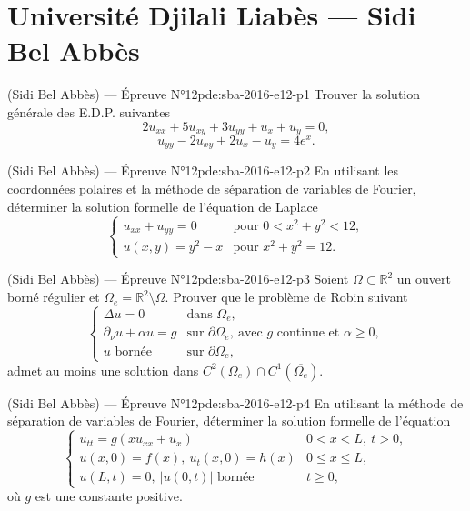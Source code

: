 \section{Université Djilali Liabès --- Sidi Bel Abbès}
\begin{problem}{(Sidi Bel Abbès) — Épreuve N°12}{pde:sba-2016-e12-p1}
Trouver la solution générale des E.D.P. suivantes
$$2u_{xx}+5u_{xy}+3u_{yy}+u_x+u_y=0,$$
$$u_{yy}-2u_{xy}+2u_x-u_y=4e^x.$$
\end{problem}
\newpage
\begin{problem}{(Sidi Bel Abbès) — Épreuve N°12}{pde:sba-2016-e12-p2}
En utilisant les coordonnées polaires et la méthode de séparation de variables de Fourier, déterminer la solution formelle de l'équation de Laplace
$$\begin{cases}u_{xx}+u_{yy}=0 & \text{pour } 0<x^2+y^2<12,\\ u(x,y)=y^2-x & \text{pour } x^2+y^2=12.\end{cases}$$
\end{problem}
\newpage
\begin{problem}{(Sidi Bel Abbès) — Épreuve N°12}{pde:sba-2016-e12-p3}
Soient $\Omega\subset\mathbb{R}^2$ un ouvert borné régulier et $\Omega_e=\mathbb{R}^2\setminus\Omega$. Prouver que le problème de Robin suivant
$$\begin{cases}\Delta u=0 & \text{dans } \Omega_e,\\ \partial_{\nu}u+\alpha u=g & \text{sur } \partial\Omega_e,\ \text{avec } g \text{ continue et } \alpha\ge0,\\ u \text{ bornée} & \text{sur } \partial\Omega_e,\end{cases}$$
admet au moins une solution dans $C^2(\Omega_e)\cap C^1(\overline{\Omega_e})$.
\end{problem}
\newpage
\begin{problem}{(Sidi Bel Abbès) — Épreuve N°12}{pde:sba-2016-e12-p4}
En utilisant la méthode de séparation de variables de Fourier, déterminer la solution formelle de l'équation
$$\begin{cases}u_{tt}=g\left(xu_{xx}+u_x\right) & 0<x<L,\ t>0,\\ u(x,0)=f(x),\ u_t(x,0)=h(x) & 0\le x\le L,\\ u(L,t)=0,\ |u(0,t)| \text{ bornée} & t\ge0,\end{cases}$$
où $g$ est une constante positive.
\end{problem}
